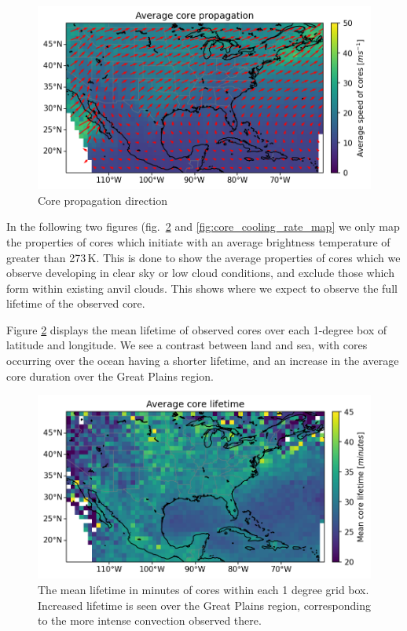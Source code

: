 \begin{figure}[tp]
    \centering
    \includegraphics[width=\textwidth]{figures/ch2_06.png}
    \caption{Core propagation direction}
    \label{fig:core_propagation_map}
\end{figure}

In the following two figures (fig.~\ref{fig:core_lifetime_map} and \ref{fig:core_cooling_rate_map} we only map the properties of cores which initiate with an average brightness temperature of greater than 273\,\unit{K}.
This is done to show the average properties of cores which we observe developing in clear sky or low cloud conditions, and exclude those which form within existing anvil clouds.
This shows where we expect to observe the full lifetime of the observed core.

Figure \ref{fig:core_lifetime_map} displays the mean lifetime of observed cores over each 1-degree box of latitude and longitude.
We see a contrast between land and sea, with cores occurring over the ocean having a shorter lifetime, and an increase in the average core duration over the Great Plains region.

\begin{figure}[tp]
    \centering
    \includegraphics[width=\textwidth]{figures/ch2_07.png}
    \caption{The mean lifetime in minutes of cores within each 1 degree grid box. Increased lifetime is seen over the Great Plains region, corresponding to the more intense convection observed there.}
    \label{fig:core_lifetime_map}
\end{figure}

